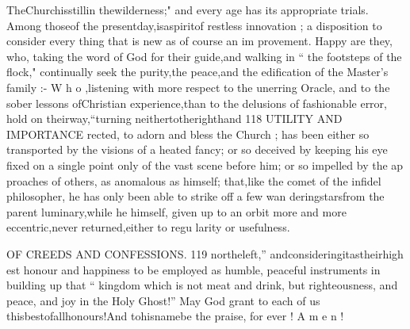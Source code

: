 \documentclass[
]{book}
\begin{document}
TheChurchisstillin thewilderness;"
and every age has its appropriate trials.
Among thoseof the presentday,isaspiritof
restless innovation ; a disposition to consider
every thing that is new as of course an im
provement. Happy are they, who, taking
the word of God for their guide,and walking
in `` the footsteps of the flock," continually seek the purity,the peace,and the edification
of the Master's family :- W h o ,listening with more respect to the unerring Oracle, and to the sober lessons ofChristian experience,than to the delusions of fashionable error, hold on
theirway,``turning neithertotherighthand
118 UTILITY AND IMPORTANCE
rected, to adorn and bless the Church ; has been either so transported by the visions of a
heated fancy; or so deceived by keeping his eye fixed on a single point only of the vast scene before him; or so impelled by the ap proaches of others, as anomalous as himself;
that,like the comet of the infidel philosopher, he has only been able to strike off a few wan deringstarsfrom the parent luminary,while he himself, given up to an orbit more and more eccentric,never returned,either to regu larity or usefulness.

OF CREEDS AND CONFESSIONS.
119
northeleft,'' andconsideringitastheirhigh est honour and happiness to be employed as
humble, peaceful instruments in building up
that `` kingdom which is not meat and drink,
but righteousness, and peace, and joy in the
Holy Ghost!'' May God grant to each of us thisbestofallhonours!And tohisnamebe
the praise, for ever ! A m e n !
\end{document}
